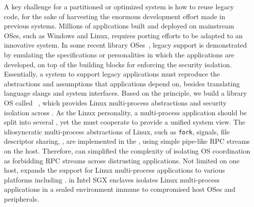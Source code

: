 A key challenge for a partitioned or optimized system is
how to reuse legacy code, %
for the sake of harvesting the enormous development effort made in previous systems.
Millions of applications built and deployed
on mainstream OSes,
such as Windows and Linux,
requires porting efforts to be adapted to an innovative system. 
In some recent library OSes~\citep{porter11drawbridge, baumann13bascule, tsai14graphene, baumann14haven},
legacy support is demonstrated
by emulating
the specifications or personalities in which the applications are developed,
on top of the building blocks for enforcing the security isolation.
Essentially, a system to support legacy applications
must reproduce the abstractions and assumptions that applications depend on,
besides translating
language slangs and system interfaces.
Based on the principle,
we build a library OS called \term{\graphene{}}~\citep{tsai14graphene},
which provides Linux multi-process abstractions and security isolation
across \picoprocs{}.
As the Linux personality, a multi-process application
should be split into several \picoprocs{},
yet the \picoprocs{} must cooperate to provide a unified system view.
The idiosyncratic multi-process abstractions of Linux, such as {\tt fork}, signals, file descriptor sharing, \sysvipc{},
are implemented in the \picoprocs{},
using simple pipe-like RPC streams on the host.
Therefore, \graphene{} can simplified the complexity of isolating OS coordination
as forbidding RPC streams across distrusting applications.
Not limited on one host,
\graphene{} expands the support for Linux multi-process applications
to various platforms including .
\graphene{} in Intel SGX enclaves isolates Linux multi-process applications
in a sealed environment immune to 
compromised host OSes and peripherals.

